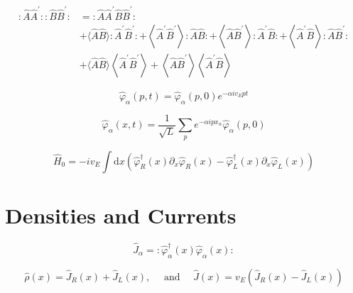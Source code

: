 \begin{align}
: \hat{A} \hat{A}^{\prime}:: \hat{B} \hat{B}^{\prime}: & =: \hat{A} \hat{A}^{\prime} \hat{B} \hat{B}^{\prime}: \nonumber \\
& +\langle\hat{A} \hat{B}\rangle: \hat{A}^{\prime} \hat{B}^{\prime}:+\left\langle\hat{A}^{\prime} \hat{B}^{\prime}\right\rangle: \hat{A} \hat{B}:+\left\langle\hat{A} \hat{B}^{\prime}\right\rangle: \hat{A}^{\prime} \hat{B}:+\left\langle\hat{A}^{\prime} \hat{B}\right\rangle: \hat{A} \hat{B}^{\prime}:  \tag{2.18}\\
& +\langle\hat{A} \hat{B}\rangle\left\langle\hat{A}^{\prime} \hat{B}^{\prime}\right\rangle+\left\langle\hat{A} \hat{B}^{\prime}\right\rangle\left\langle\hat{A}^{\prime} \hat{B}\right\rangle \nonumber
\end{align}



 




$$
\hat{\varphi}_{\alpha}(p, t)=\hat{\varphi}_{\alpha}(p, 0) e^{-\alpha i v_{E} p t}
$$

$$
\hat{\varphi}_{\alpha}(x, t)=\frac{1}{\sqrt{L}} \sum_{p} e^{-\alpha i p x_{\alpha}} \hat{\varphi}_{\alpha}(p, 0)
$$


$$
\hat{H}_{0}=-i v_{E} \int \mathrm{d} x\left(\hat{\varphi}_{R}^{\dagger}(x) \partial_{x} \hat{\varphi}_{R}(x)-\hat{\varphi}_{L}^{\dagger}(x) \partial_{x} \hat{\varphi}_{L}(x)\right)
$$














\section{Densities and Currents}

\begin{equation*}
\hat{J}_{\alpha}=: \hat{\varphi}_{\alpha}^{\dagger}(x) \hat{\varphi}_{\alpha}(x): \tag{2.14}
\end{equation*}



\begin{equation*}
\hat{\rho}(x)=\hat{J}_{R}(x)+\hat{J}_{L}(x), \quad \text { and } \quad \hat{J}(x)=v_{E}\left(\hat{J}_{R}(x)-\hat{J}_{L}(x)\right) \tag{2.15}
\end{equation*}



